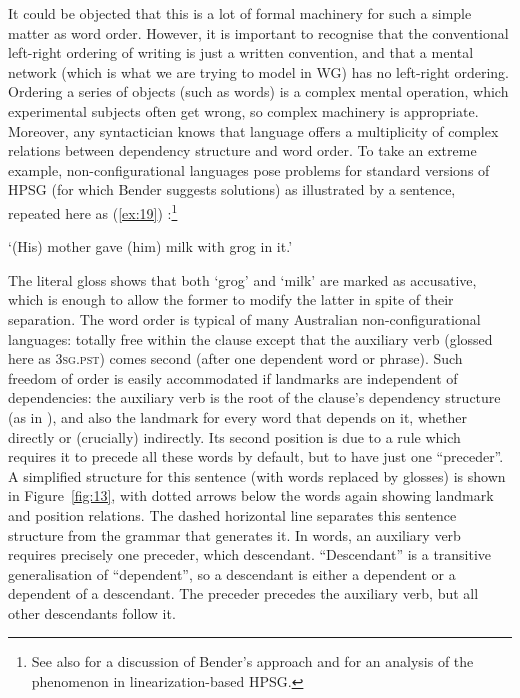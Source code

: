 \documentclass[output=paper
 	        ,biblatex
                ,babelshorthands
                ,newtxmath
                ,draftmode
                ,colorlinks, citecolor=brown
]{langscibook}
\begin{document}
\largerpage[-1]
It could be objected that this is a lot of formal machinery for such a simple matter as word order. However, it is important to recognise that the conventional left-right ordering of writing is just a written convention, and that a mental network (which is what we are trying to model in WG) has no left-right ordering. Ordering a series of objects (such as words) is a complex mental operation, which experimental subjects often get wrong, so complex machinery is appropriate.
Moreover, any syntactician knows that language offers a multiplicity of complex relations between
dependency structure and word order. To take an extreme example, non-configurational languages pose
problems for standard versions of HPSG (for which Bender suggests solutions) as illustrated by a
 sentence, repeated here as (\ref{ex:19}) \parencites[]{Bender2008a}{Nordlinger1998}:\footnote{
  See also  for a discussion of
    Bender's approach and  for an analysis
    of the phenomenon in linearization-based HPSG.
}

\begin{exe}
\ex \label{ex:19}
\glt `(His) mother gave (him) milk with grog in it.'
\end{exe}

\largerpage
\noindent
The literal gloss shows that both `grog' and `milk' are marked as accusative, which is enough to allow the former to modify the latter in spite of their separation. The word order is typical of many Australian non-configurational languages: totally free within the clause except that the auxiliary verb (glossed here as \textsc{3sg.pst}) comes second (after one dependent word or phrase). Such freedom of order is easily accommodated if landmarks are independent of dependencies: the auxiliary verb is the root of the clause's dependency structure (as in ), and also the landmark for every word that depends on it, whether directly or (crucially) indirectly. Its second position is due to a rule which requires it to precede all these words by default, but to have just one ``preceder''. A simplified structure for this sentence (with  words replaced by  glosses) is shown in Figure~\ref{fig:13}, with dotted arrows below the words again showing landmark and position relations. The dashed horizontal line separates this sentence structure from the grammar that generates it. In words, an auxiliary verb requires precisely one preceder, which  descendant. ``Descendant'' is a transitive generalisation of ``dependent'', so a descendant is either a dependent or a dependent of a descendant. The preceder precedes the auxiliary verb, but all other descendants follow it.
\end{document}
